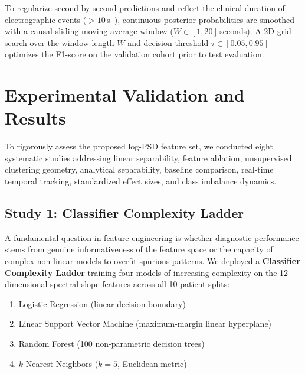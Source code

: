\documentclass[10pt,twocolumn,letterpaper]{article}
\begin{document}
To regularize second-by-second predictions and reflect the clinical duration of electrographic events ($>10$\,s~\cite{shellhaas2011}), continuous posterior probabilities are smoothed with a causal sliding moving-average window ($W \in [1, 20]$\,seconds). A 2D grid search over the window length $W$ and decision threshold $\tau \in [0.05, 0.95]$ optimizes the F1-score on the validation cohort prior to test evaluation.

\section{Experimental Validation and Results}\label{sec:results}

To rigorously assess the proposed log-PSD feature set, we conducted eight systematic studies addressing linear separability, feature ablation, unsupervised clustering geometry, analytical separability, baseline comparison, real-time temporal tracking, standardized effect sizes, and class imbalance dynamics.

\subsection{Study 1: Classifier Complexity Ladder}\label{subsec:study1}

A fundamental question in feature engineering is whether diagnostic performance stems from genuine informativeness of the feature space or the capacity of complex non-linear models to overfit spurious patterns. We deployed a \textbf{Classifier Complexity Ladder} training four models of increasing complexity on the 12-dimensional spectral slope features across all 10 patient splits:
\begin{enumerate}
    \item Logistic Regression (linear decision boundary)
    \item Linear Support Vector Machine (maximum-margin linear hyperplane)
    \item Random Forest (100 non-parametric decision trees)
    \item $k$-Nearest Neighbors ($k=5$, Euclidean metric)
\end{enumerate}
\end{document}
